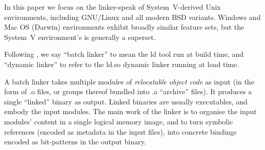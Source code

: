In this paper we focus on the linker-speak of System~V-derived Unix environments,
including GNU/Linux and all modern BSD variants.
Windows and Mac OS (Darwin) environments exhibit broadly similar feature sets,
but the System~V environment's is generally a superset.

Following \citet{gingell_1987_shared}, we say ``batch linker''
to mean the \textsf{ld} tool run at build time, and 
``dynamic linker'' to refer to the \textsf{ld.so} dynamic linker running
at load time.

A batch linker takes multiple modules of \emph{relocatable object code} 
as input (in the form of \textsf{.o} files, or groups thereof bundled into 
\textsf{.a} ``archive'' files).
It produces a single ``linked'' binary as output.
Linked binaries are usually executables, and embody the input modules.
The main work of the linker is to organise the input modules' content
in a single logical memory image, 
and to turn symbolic references (encoded as metadata in the input files), 
into concrete bindings encoded as bit-patterns in the output binary.

